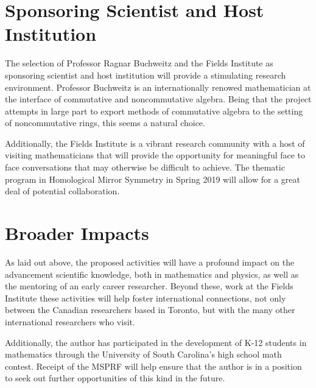 \documentclass[11pt]{article}
\begin{document}
\section{Sponsoring Scientist and Host Institution}
The selection of Professor Ragnar Buchweitz and the Fields Institute as sponsoring scientist and host institution will provide a stimulating research environment.
Professor Buchweitz is an internationally renowed mathematician at the interface of commutative and noncommutative algebra.
Being that the project attempts in large part to export methods of commutative algebra to the setting of noncommutative rings, this seems a natural choice.

Additionally, the Fields Institute is a vibrant research community with a host of visiting mathematicians that will provide the opportunity for meaningful face to face conversations that may otherwise be difficult to achieve.
The thematic program in Homological Mirror Symmetry in Spring 2019 will allow for a great deal of potential collaboration.

\section{Broader Impacts}

As laid out above, the proposed activities will have a profound impact on the advancement scientific knowledge, both in mathematics and physics, as well as the mentoring of an early career researcher.
Beyond these, work at the Fields Institute these activities will help foster international connections, not only between the Canadian researchers based in Toronto, but with the many other international researchers who visit.

Additionally, the author has participated in the development of K-12 students in mathematics through the University of South Carolina's high school math contest.
Receipt of the MSPRF will help ensure that the author is in a position to seek out further opportunities of this kind in the future.


\end{document}
